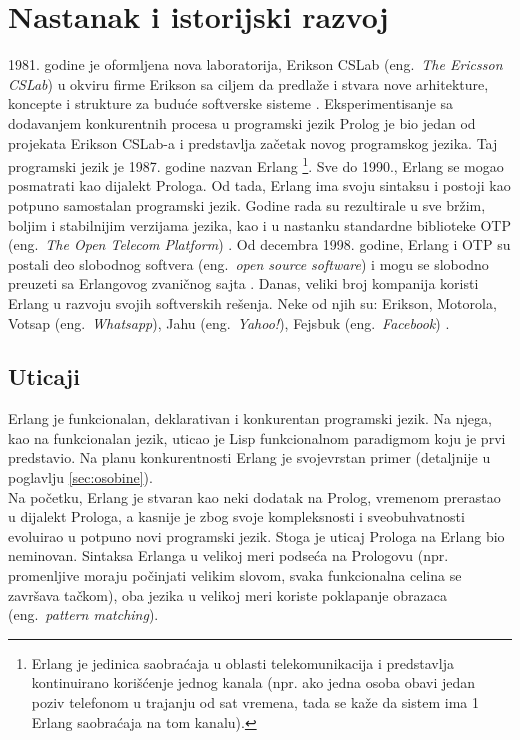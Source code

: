\documentclass[a4paper]{article}
\begin{document}
\section{Nastanak i istorijski razvoj}
\label{sec:nastanak}
1981. godine je oformljena nova laboratorija, Erikson CSLab (eng.~{\em The Ericsson CSLab}) u okviru firme Erikson sa
ciljem da predlaže i stvara nove arhitekture, koncepte i strukture za buduće softverske sisteme \cite{phdthesis}.
Eksperimentisanje sa dodavanjem konkurentnih procesa u programski jezik Prolog je bio jedan
od projekata Erikson CSLab-a i predstavlja začetak novog programskog jezika.
Taj programski jezik je 1987. godine nazvan Erlang
\footnote{ Erlang je jedinica saobraćaja u oblasti telekomunikacija 
i predstavlja kontinuirano korišćenje jednog kanala 
(npr. ako jedna osoba obavi jedan poziv telefonom u trajanju od sat vremena, 
tada se kaže da sistem ima 1 Erlang saobraćaja na tom kanalu).}.    
Sve do 1990., Erlang se mogao posmatrati kao dijalekt Prologa. Od tada, Erlang
ima svoju sintaksu i postoji kao potpuno samostalan programski jezik.
Godine rada su rezultirale u sve bržim, boljim i stabilnijim verzijama jezika, kao
i u nastanku standardne biblioteke OTP (eng.~{\em The Open Telecom Platform}) \cite{phdthesis}.
Od decembra 1998. godine, Erlang i OTP su postali deo slobodnog softvera (eng.~{\em open source software})
i mogu se slobodno preuzeti sa Erlangovog zvaničnog sajta \cite{sajt}.
Danas, veliki broj kompanija koristi Erlang u razvoju
svojih softverskih rešenja. Neke od njih su: Erikson, Motorola, Votsap (eng.~{\em Whatsapp}), 
Jahu (eng.~{\em Yahoo!}), Fejsbuk (eng.~{\em Facebook}) \cite{sajt}.


\subsection{Uticaji}
\label{subsec:uticaji}
Erlang je funkcionalan, deklarativan i konkurentan programski jezik.
Na njega, kao na funkcionalan jezik, uticao je Lisp funkcionalnom paradigmom koju je 
prvi predstavio. Na planu konkurentnosti Erlang je svojevrstan primer (detaljnije u poglavlju \ref{sec:osobine}). \\ 

Na početku, Erlang je stvaran kao neki dodatak na Prolog, vremenom prerastao u 
dijalekt Prologa, a kasnije je zbog svoje kompleksnosti i sveobuhvatnosti evoluirao
u potpuno novi programski jezik. Stoga je uticaj Prologa na Erlang bio 
neminovan. Sintaksa Erlanga u velikoj meri podseća na Prologovu 
(npr. promenljive moraju počinjati velikim slovom, 
svaka funkcionalna celina se završava tačkom), oba jezika u velikoj meri koriste poklapanje obrazaca
(eng.~{\em pattern matching}). \\
\end{document}
